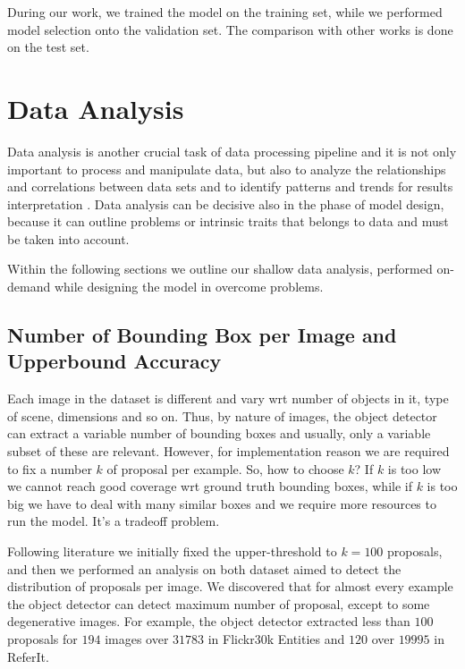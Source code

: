 During our work, we trained the model on the training set, while we
performed model selection onto the validation set. The comparison with
other works is done on the test set. 

\section{Data Analysis}
\label{sec:data-analysis}

Data analysis is another crucial task of data processing pipeline and
it is not only important to process and manipulate data, but also to
analyze the relationships and correlations between data sets and to
identify patterns and trends for results interpretation
\cite{sharma2020understanding}. Data analysis can be decisive also in
the phase of model design, because it can outline problems or
intrinsic traits that belongs to data and must be taken into account.

Within the following sections we outline our shallow data analysis,
performed on-demand while designing the model in overcome problems.

\subsection{Number of Bounding Box per Image and Upperbound Accuracy}
\label{subsec:num-of-proposals}

Each image in the dataset is different and vary wrt number of objects
in it, type of scene, dimensions and so on. Thus, by nature of images,
the object detector can extract a variable number of bounding boxes
and usually, only a variable subset of these are relevant. However,
for implementation reason we are required to fix a number $k$ of
proposal per example. So, how to choose $k$? If $k$ is too low we
cannot reach good coverage wrt ground truth bounding boxes, while if
$k$ is too big we have to deal with many similar boxes and we require
more resources to run the model. It's a tradeoff problem.

Following literature we initially fixed the upper-threshold to $k =
100$ proposals, and then we performed an analysis on both dataset
aimed to detect the distribution of proposals per image. We discovered
that for almost every example the object detector can detect maximum
number of proposal, except to some degenerative images. For example,
the object detector extracted less than $100$ proposals for $194$
images over $31783$ in Flickr30k Entities and $120$ over $19995$ in
ReferIt.


